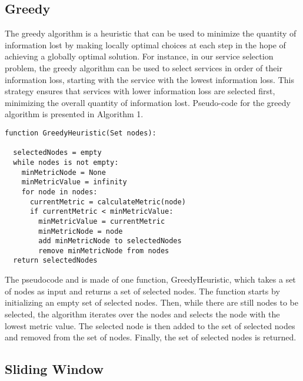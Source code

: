 \subsection*{Greedy}
The greedy algorithm is a heuristic that can be used to minimize the quantity of information lost by making locally optimal choices at each step in the hope of achieving a globally optimal solution.
For instance, in our service selection problem, the greedy algorithm can be used to select services in order of their information loss, starting with the service with the lowest information loss.
This strategy ensures that services with lower information loss are selected first, minimizing the overall quantity of information lost.
Pseudo-code for the greedy algorithm is presented in Algorithm 1.
\begin{lstlisting}[frame=single,caption={Greedy Heuristic Pseudocode},label={lst:greedy}]
function GreedyHeuristic(Set nodes):

  selectedNodes = empty
  while nodes is not empty:
    minMetricNode = None
    minMetricValue = infinity
    for node in nodes:
      currentMetric = calculateMetric(node)
      if currentMetric < minMetricValue:
        minMetricValue = currentMetric
        minMetricNode = node
        add minMetricNode to selectedNodes
        remove minMetricNode from nodes
  return selectedNodes
        \end{lstlisting}

The pseudocode and is made of one function, GreedyHeuristic, which takes a set of nodes as input and returns a set of selected nodes.
The function starts by initializing an empty set of selected nodes.
Then, while there are still nodes to be selected, the algorithm iterates over the nodes and selects the node with the lowest metric value.
The selected node is then added to the set of selected nodes and removed from the set of nodes.
Finally, the set of selected nodes is returned.

\subsection*{Sliding Window}



